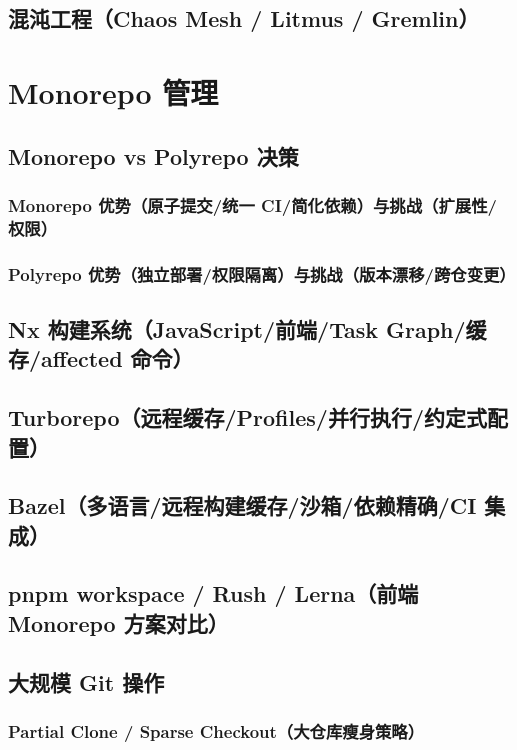 \documentclass[12pt,UTF8]{ctexbook}
\begin{document}
  \section{混沌工程（Chaos Mesh / Litmus / Gremlin）}


\chapter{Monorepo 管理}
\label{chap:monorepo}

  \section{Monorepo vs Polyrepo 决策}
    \subsection{Monorepo 优势（原子提交/统一 CI/简化依赖）与挑战（扩展性/权限）}
    \subsection{Polyrepo 优势（独立部署/权限隔离）与挑战（版本漂移/跨仓变更）}

  \section{Nx 构建系统（JavaScript/前端/Task Graph/缓存/affected 命令）}

  \section{Turborepo（远程缓存/Profiles/并行执行/约定式配置）}

  \section{Bazel（多语言/远程构建缓存/沙箱/依赖精确/CI 集成）}

  \section{pnpm workspace / Rush / Lerna（前端 Monorepo 方案对比）}

  \section{大规模 Git 操作}
    \subsection{Partial Clone / Sparse Checkout（大仓库瘦身策略）}
\end{document}
